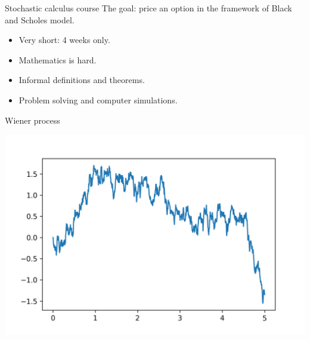 
\begin{frame} %


\end{frame}


\begin{frame}{Stochastic calculus course}
  The goal: price an option in the framework of Black and Scholes model. 

  \begin{itemize}[<+->]
    \item Very short: \alert{4 weeks} only.
    \item Mathematics is \alert{hard}.
    \item \alert{Informal} definitions and theorems. 
    \item \alert{Problem solving} and computer \alert{simulations}. 
  \end{itemize}

\end{frame}


\begin{frame}{Wiener process}

  \includegraphics[width=\textwidth]{pictures/wiener_process.png}


\end{frame}


